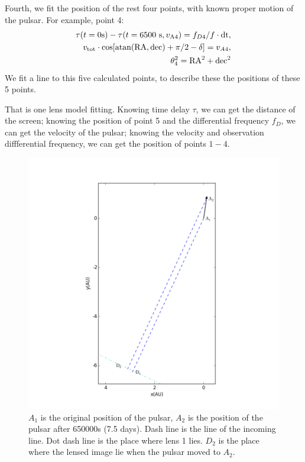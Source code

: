 \documentclass[useAMS,usenatbib]{mn2e}
\begin{document}
Fourth, we fit the position of the rest four points, with known proper motion of the pulsar. For example, point 4:
\begin{align*}
\tau(t=0 {\rm s}) -\tau(t=6500~{\rm s}, v_{\rm A4}) = f_{D4} /f\cdot{\rm dt},\\
v_{\rm tot}\cdot {\rm cos[ atan(RA,dec)+\pi/2-\delta]} =v_{A4},\\
\theta_4^2 ={\rm RA}^2+{\rm dec}^2
\end{align*}
We fit a line to this five calculated points, to describe these the positions of these 5 points. 

That is one lens model fitting. Knowing time delay ${\tau}$, we can get the distance of the screen; knowing the position of point 5 and the differential frequency ${f_D}$, we can get the velocity of the pulsar; knowing the velocity and observation diffferential frequency, we can get the position of points $1-4$.

\begin{figure}
\centering
\includegraphics[width=1.0\linewidth, angle=0]{One_lens_reflection.png}
\caption{$A_1$ is the original position of the pulsar, $A_2$ is the position of the pulsar after 650000s (7.5 days). Dash line is the line of the incoming line. Dot dash line is the place where lens 1 lies. $D_2$ is the place where the lensed image lie when the pulsar moved to $A_2$.}
\label{OneLensReflect}
\end{figure}
\end{document}
